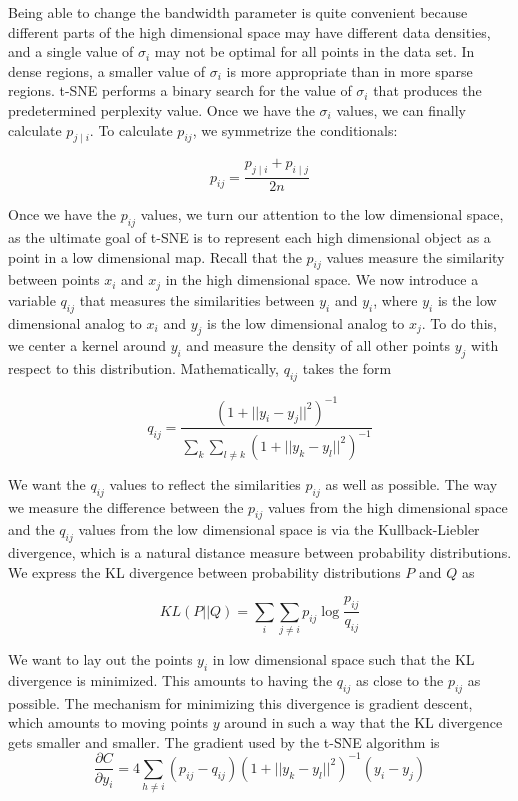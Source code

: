 \documentclass{article}
\begin{document}
Being able to change the bandwidth parameter is quite convenient because different parts of the high dimensional space may have different data densities, and a single value of $\sigma_i$ may not be optimal for all points in the data set. In dense regions, a smaller value of $\sigma_i$ is more appropriate than in more sparse regions. t-SNE performs a binary search for the value of $\sigma_i$ that produces the predetermined perplexity value. Once we have the $\sigma_i$ values, we can finally calculate $ p_{j \mid i}$. To calculate $p_{ij}$, we symmetrize the conditionals:

$$p_{ij} = \frac{p_{j\mid i} + p_{i\mid j}}{2n}$$

Once we have the $p_{ij}$ values, we turn our attention to the low dimensional space, as the ultimate goal of t-SNE is to represent each high dimensional object as a point in a low dimensional map. Recall that the $p_{ij}$ values measure the similarity between points $x_i$ and $x_j$ in the high dimensional space. We now introduce a variable $q_{ij}$ that measures the similarities between $y_i$ and $y_i$, where $y_i$ is the low dimensional analog to $x_i$ and $y_j$ is the low dimensional analog to $x_j$. To do this, we center a kernel around $y_i$ and measure the density of all other points $y_j$ with respect to this distribution. Mathematically, $q_{ij}$ takes the form 

$$q_{ij} = \frac{\left(1 + ||y_i - y_j||^2\right)^{-1}}{\sum_{k}\sum_{l \not = k}\left(1 + ||y_k - y_l||^2\right)^{-1}}$$

We want the $q_{ij}$ values to reflect the similarities $p_{ij}$ as well as possible. The way we measure the difference between the $p_{ij}$ values from the high dimensional space and the $q_{ij}$ values from the low dimensional space is via the Kullback-Liebler divergence, which is a natural distance measure between probability distributions. We express the KL divergence between probability distributions $P$ and $Q$ as 

$$KL(P||Q) = \sum_{i}\sum_{j\not = i} p_{ij} \log \frac{p_{ij}}{q_{ij}}$$

We want to lay out the points $y_i$ in low dimensional space such that the KL divergence is minimized. This amounts to having the $q_{ij}$ as close to the $p_{ij}$ as possible. The mechanism for minimizing this divergence is gradient descent, which amounts to moving points $y$ around in such a way that the KL divergence gets smaller and smaller. The gradient used by the t-SNE algorithm is
$$\frac{\partial C}{\partial y_i} = 4\sum_{h \not = i} (p_{ij} - q_{ij})\left(1 + ||y_k - y_l||^2\right)^{-1}(y_i - y_j)$$
\end{document}
